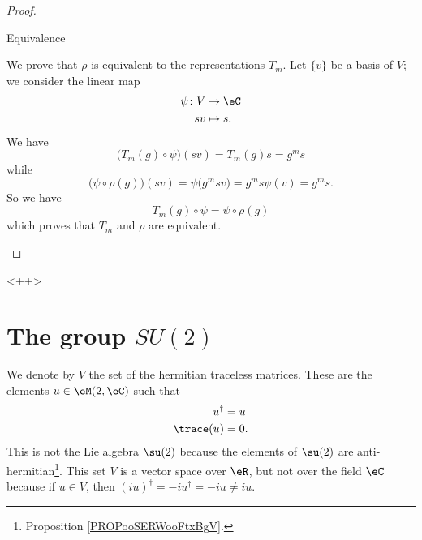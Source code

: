\begin{proof}
\begin{subproof}
        \item[Equivalence]

            We prove that \( \rho\) is equivalent to the representations \( T_m\). Let \( \{ v \}\) be a basis of \( V\); we consider the linear map
            \begin{equation}
                \begin{aligned}
                    \psi\colon V&\to \eC \\
                    sv&\mapsto s. 
                \end{aligned}
            \end{equation}
            We have
            \begin{equation}
                \big( T_m(g)\circ \psi \big)(sv)=T_m(g)s=g^ms
            \end{equation}
            while
            \begin{equation}
                \big( \psi\circ\rho(g) \big)(sv)=\psi\big( g^msv \big)=g^ms\psi(v)=g^ms.
            \end{equation}
            So we have
            \begin{equation}
                T_m(g)\circ \psi=\psi\circ\rho(g)
            \end{equation}
            which proves that \( T_m\) and \( \rho\) are equivalent.
    \end{subproof}
\end{proof}
<++>

\section{The group \texorpdfstring{$SU(2)$}{SU2}}

We denote by \( V\) the set of the hermitian traceless matrices. These are the elements \( u\in \eM(2,\eC)\) such that
\begin{subequations}
    \begin{align}
        u^{\dag}&=u\\
        \trace(u)&=0.
    \end{align}
\end{subequations}
This is not the Lie algebra \( \su(2)\) because the elements of \( \su(2)\) are anti-hermitian\footnote{Proposition \ref{PROPooSERWooFtxBgV}.}. This set \( V\) is a vector space over \( \eR\), but not over the field \( \eC\) because if \( u\in V\), then \( (iu)^{\dag}=-iu^{\dag}=-iu\neq iu\).


